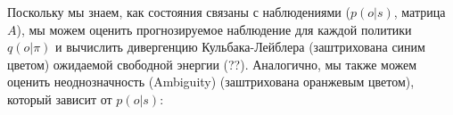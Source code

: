 \documentclass[12pt]{article}
\begin{document}
\begin{figure}[h]
\end{figure}


Поскольку мы знаем, как состояния связаны с наблюдениями ($p(o|s)$, матрица $A$), мы можем оценить прогнозируемое наблюдение для каждой политики $q(o|\pi)$ и вычислить дивергенцию Кульбака-Лейблера (заштрихована синим цветом) ожидаемой свободной энергии (??). Аналогично, мы также можем оценить неоднозначность (Ambiguity) (заштрихована оранжевым цветом), который зависит от $p(o|s)$:

\begin{figure}[h]
\end{figure}

\end{document}
